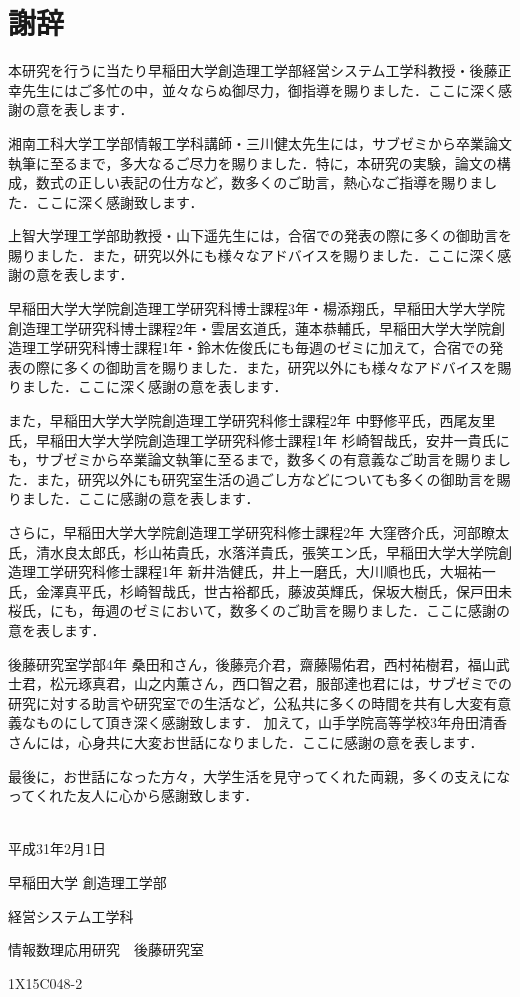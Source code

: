 ﻿\chapter*{謝辞}

本研究を行うに当たり早稲田大学創造理工学部経営システム工学科教授・後藤正幸先生にはご多忙の中，並々ならぬ御尽力，御指導を賜りました．ここに深く感謝の意を表します．

湘南工科大学工学部情報工学科講師・三川健太先生には，サブゼミから卒業論文執筆に至るまで，多大なるご尽力を賜りました．特に，本研究の実験，論文の構成，数式の正しい表記の仕方など，数多くのご助言，熱心なご指導を賜りました．ここに深く感謝致します．

上智大学理工学部助教授・山下遥先生には，合宿での発表の際に多くの御助言を賜りました．また，研究以外にも様々なアドバイスを賜りました．ここに深く感謝の意を表します．

早稲田大学大学院創造理工学研究科博士課程3年・楊添翔氏，早稲田大学大学院創造理工学研究科博士課程2年・雲居玄道氏，蓮本恭輔氏，早稲田大学大学院創造理工学研究科博士課程1年・鈴木佐俊氏にも毎週のゼミに加えて，合宿での発表の際に多くの御助言を賜りました．また，研究以外にも様々なアドバイスを賜りました．ここに深く感謝の意を表します．

また，早稲田大学大学院創造理工学研究科修士課程2年 中野修平氏，西尾友里氏，早稲田大学大学院創造理工学研究科修士課程1年 杉崎智哉氏，安井一貴氏にも，サブゼミから卒業論文執筆に至るまで，数多くの有意義なご助言を賜りました．また，研究以外にも研究室生活の過ごし方などについても多くの御助言を賜りました．ここに感謝の意を表します．

さらに，早稲田大学大学院創造理工学研究科修士課程2年 大窪啓介氏，河部瞭太氏，清水良太郎氏，杉山祐貴氏，水落洋貴氏，張笑エン氏，早稲田大学大学院創造理工学研究科修士課程1年 新井浩健氏，井上一磨氏，大川順也氏，大堀祐一氏，金澤真平氏，杉崎智哉氏，世古裕都氏，藤波英輝氏，保坂大樹氏，保戸田未桜氏，にも，毎週のゼミにおいて，数多くのご助言を賜りました．ここに感謝の意を表します．

後藤研究室学部4年 桑田和さん，後藤亮介君，齋藤陽佑君，西村祐樹君，福山武士君，松元琢真君，山之内薫さん，西口智之君，服部達也君には，サブゼミでの研究に対する助言や研究室での生活など，公私共に多くの時間を共有し大変有意義なものにして頂き深く感謝致します． 加えて，山手学院高等学校3年舟田清香さんには，心身共に大変お世話になりました．ここに感謝の意を表します．

最後に，お世話になった方々，大学生活を見守ってくれた両親，多くの支えになってくれた友人に心から感謝致します．

　\\
\hspace*{15zw}平成31年2月1日

\hspace*{15zw}早稲田大学 創造理工学部

\hspace*{15zw}経営システム工学科 

\hspace*{15zw}情報数理応用研究　後藤研究室

\hspace*{15zw}1X15C048-2